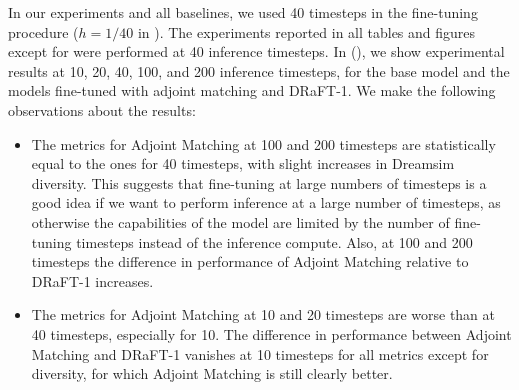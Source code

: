 In our experiments and all baselines, we used 40 timesteps in the fine-tuning procedure ($h=1/40$ in ). The experiments reported in all tables and figures except for  were performed at 40 inference timesteps. In  (), we show experimental results at 10, 20, 40, 100, and 200 inference timesteps, for the base model and the models fine-tuned with adjoint matching and DRaFT-1. We make the following observations about the results: 
\begin{itemize}
\item The metrics for Adjoint Matching at 100 and 200 timesteps are statistically equal to the ones for 40 timesteps, with slight increases in Dreamsim diversity. This suggests that fine-tuning at large numbers of timesteps is a good idea if we want to perform inference at a large number of timesteps, as otherwise the capabilities of the model are limited by the number of fine-tuning timesteps instead of the inference compute. Also, at 100 and 200 timesteps the difference in performance of Adjoint Matching relative to DRaFT-1 increases.
\item The metrics for Adjoint Matching at 10 and 20 timesteps are worse than at 40 timesteps, especially for 10. The difference in performance between Adjoint Matching and DRaFT-1 vanishes at 10 timesteps for all metrics except for diversity, for which Adjoint Matching is still clearly better.
\end{itemize}

